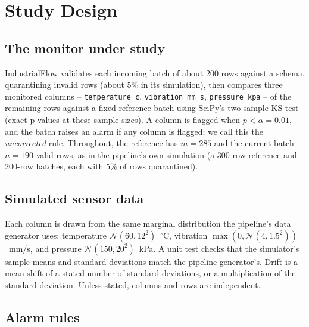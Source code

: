 \documentclass[11pt]{article}
\begin{document}
\section{Study Design}
\label{sec:design}

\subsection{The monitor under study}

IndustrialFlow validates each incoming batch of about 200 rows against a schema, quarantining invalid rows (about 5\% in its simulation), then compares three monitored columns -- \texttt{temperature\_c}, \texttt{vibration\_mm\_s}, \texttt{pressure\_kpa} -- of the remaining rows against a fixed reference batch using SciPy's two-sample KS test \citep{virtanen2020scipy} (exact p-values at these sample sizes). A column is flagged when $p<\alpha=0.01$, and the batch raises an alarm if any column is flagged; we call this the \emph{uncorrected} rule. Throughout, the reference has $m=285$ and the current batch $n=190$ valid rows, as in the pipeline's own simulation (a 300-row reference and 200-row batches, each with 5\% of rows quarantined).

\subsection{Simulated sensor data}

Each column is drawn from the same marginal distribution the pipeline's data generator uses: temperature $\mathcal N(60,12^2)$~$^\circ$C, vibration $\max(0,\mathcal N(4,1.5^2))$~mm/s, and pressure $\mathcal N(150,20^2)$~kPa. A unit test checks that the simulator's sample means and standard deviations match the pipeline generator's. Drift is a mean shift of a stated number of standard deviations, or a multiplication of the standard deviation. Unless stated, columns and rows are independent.

\subsection{Alarm rules}
\end{document}
